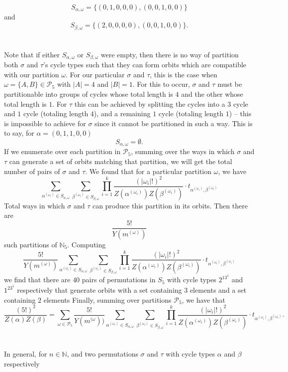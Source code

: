 \[
S_{\alpha,\omega} = \{(0,1,0,0,0), (0,0,1,0,0)\}
\]
and 
\[
S_{\beta,\omega} = \{(2,0,0,0,0), (0, 0, 1,0,0)\}.
\]
\\\\Note that if either $S_{\alpha,\omega}$ or $S_{\beta,\omega}$ were empty, then there is no way of partition both $\sigma$ and $\tau$'s cycle types such that they can form orbits which are compatible with our partition $\omega$. For our particular $\sigma$ and $\tau$, this is the case when $\omega = \{A,B\}\in\mathcal{P}_5$ with $|A| = 4$ and $|B| = 1$. For this to occur, $\sigma$ and $\tau$ must be partitionable into groups of cycles whose total length is $4$ and the other whose total length is $1$. For $\tau$ this can be achieved by splitting the cycles into a $3$ cycle and $1$ cycle (totaling length $4$), and a remaining $1$ cycle (totaling length $1$) -- this is impossible to achieve for $\sigma$ since it cannot be partitioned in such a way. This is to say, for $\alpha = (0,1,1,0,0)$
\[
    S_{\alpha,\omega} = \emptyset.
\]
If we enumerate over each partition in $\mathcal{P}_5$, summing over the ways in which $\sigma$ and $\tau$ can generate a set of orbits matching that partition, we will get the total number of pairs of $\sigma$ and $\tau$. We found that for a particular partition $\omega$, we have 
\[
\sum_{\alpha^{(\omega_i)}\in S_{\alpha,\omega}}\sum_{\beta^{(\omega_i)}\in S_{\beta,\omega}}\prod_{i=1}^k
{\frac{(|\omega_i|!)^2}{Z(\alpha^{(\omega_i)})Z(\beta^{(\omega_i)})}}\cdot t_{\alpha^{(\omega_i)},\beta^{(\omega_i)}}\]
Total ways in which $\sigma$ and $\tau$ can produce this partition in its orbits. Then there are 
\[
\frac{5!}{Y(m^{(\omega)})}
\]
such partitions of $\mathbb{N}_5$. Computing 
\[
\frac{5!}{Y(m^{(\omega)})}\sum_{\alpha^{(\omega_i)}\in S_{\alpha,\omega}}\sum_{\beta^{(\omega_i)}\in S_{\beta,\omega}}\prod_{i=1}^k
{\frac{(|\omega_i|!)^2}{Z(\alpha^{(\omega_i)})Z(\beta^{(\omega_i)})}}\cdot t_{\alpha^{(\omega_i)},\beta^{(\omega_i)}}
\]
we find that there are $40$ pairs of permutations in $S_5$ with cycle types $2^13^1$ and $1^23^1$ respectively that generate orbits with a set containing $3$ elements and a set containing $2$ elements
Finally, summing over partitions $\mathcal{P}_5$, we have that 
\[
    \frac{(5!)^2}{Z(\alpha)Z(\beta)} = \sum_{\omega\in\mathcal{P}_5}\frac{5!}{Y(m^{(\omega}))}\sum_{\alpha^{(\omega_i)}\in S_{\alpha,\omega}}\sum_{\beta^{(\omega_i)}\in S_{\beta,\omega}}\prod_{i=1}^k
{\frac{(|\omega_i|!)^2}{Z(\alpha^{(\omega_i)})Z(\beta^{(\omega_i)})}}\cdot t_{\alpha^{(\omega_i)},\beta^{(\omega_i)}}.
\]
\\\\In general, for $n\in\mathbb{N}$, and two permutations $\sigma$ and $\tau$ with cycle types $\alpha$ and $\beta$ respectively
